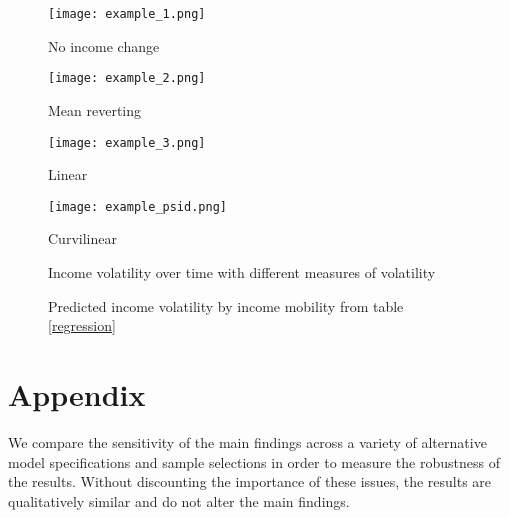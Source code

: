 \documentclass[12pt]{article}
\begin{document}
\begin{sidewaysfigure}[htp!]
    \caption{Examples of income, volatility, and direction} 
    \label{examples}
    \centering
    \begin{subfigure}[b]{0.45\textwidth}
        \texttt{[image: example\_1.png]}
        \caption{No income change}
        \label{examples_sub1}
    \end{subfigure}
    \begin{subfigure}[b]{0.45\textwidth}
        \texttt{[image: example\_2.png]}
        \caption{Mean reverting}
        \label{examples_sub2}
    \end{subfigure}
        \begin{subfigure}[b]{0.45\textwidth}
        \texttt{[image: example\_3.png]}
        \caption{Linear}
        \label{examples_sub3}
    \end{subfigure}
    \begin{subfigure}[b]{0.45\textwidth}
        \texttt{[image: example\_psid.png]}
        \caption{Curvilinear}
        \label{examples_sub4}
    \end{subfigure}
\end{sidewaysfigure}

\begin{figure}[htp!]
\centering
\caption{Income volatility over time with different measures of volatility} 
\centering
{}
\label{volatility_graph}
\end{figure}

\begin{figure}[htp!]
\centering
\caption{Predicted income volatility by income mobility from table \ref{regression}} 
\centering
{}
\label{margins_mobility}
\end{figure}


\clearpage
\appendix
\section{Appendix}
\label{appendix_a}
\setcounter{table}{0}
\setcounter{figure}{0}
\renewcommand*\thetable{\Alph{section}.\arabic{table}}
\renewcommand*\thefigure{\Alph{section}.\arabic{figure}}

We compare the sensitivity of the main findings across a variety of alternative model specifications and sample selections in order to measure the robustness of the results. Without discounting the importance of these issues, the results are qualitatively similar and do not alter the main findings. 
\end{document}
